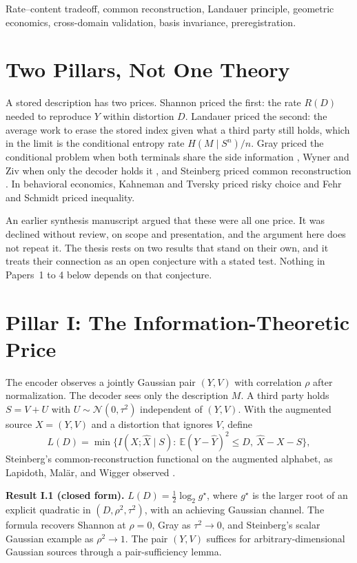 \documentclass[11pt,onecolumn]{IEEEtran}
\newcommand{\E}{\mathbb{E}}
\newcommand{\hY}{\hat Y}
\newcommand{\hX}{\hat X}
\begin{document}
\begin{IEEEkeywords}
Rate--content tradeoff, common reconstruction, Landauer principle, geometric economics, cross-domain validation, basis invariance, preregistration.
\end{IEEEkeywords}

\section{Two Pillars, Not One Theory}

A stored description has two prices.
Shannon priced the first: the rate $R(D)$ needed to reproduce $Y$ within distortion $D$.
Landauer priced the second: the average work to erase the stored index given what a third party still holds, which in the limit is the conditional entropy rate $H(M\mid S^n)/n$.
Gray priced the conditional problem when both terminals share the side information \cite{gray1972tr,gray1973}, Wyner and Ziv when only the decoder holds it \cite{wynerziv1976}, and Steinberg priced common reconstruction \cite{steinberg2009}.
In behavioral economics, Kahneman and Tversky priced risky choice and Fehr and Schmidt priced inequality.

An earlier synthesis manuscript argued that these were all one price.
It was declined without review, on scope and presentation, and the argument here does not repeat it.
The thesis rests on two results that stand on their own, and it treats their connection as an open conjecture with a stated test.
Nothing in Papers~1 to 4 below depends on that conjecture.

\section{Pillar I: The Information-Theoretic Price}

The encoder observes a jointly Gaussian pair $(Y,V)$ with correlation $\rho$ after normalization.
The decoder sees only the description $M$.
A third party holds $S=V+U$ with $U\sim\mathcal N(0,\tau^2)$ independent of $(Y,V)$.
With the augmented source $X=(Y,V)$ and a distortion that ignores $V$, define
\begin{equation}
L(D)=\min\bigl\{I(X;\hX\mid S):\ \E(Y-\hY)^2\le D,\ \hX - X - S\bigr\},
\end{equation}
Steinberg's common-reconstruction functional on the augmented alphabet, as Lapidoth, Mal\"ar, and Wigger observed \cite{lapidoth2014}.

\textbf{Result I.1 (closed form).}
$L(D)=\tfrac12\log_2 g^\star$, where $g^\star$ is the larger root of an explicit quadratic in $(D,\rho^2,\tau^2)$, with an achieving Gaussian channel.
The formula recovers Shannon at $\rho=0$, Gray as $\tau^2\to0$, and Steinberg's scalar Gaussian example as $\rho^2\to1$.
The pair $(Y,V)$ suffices for arbitrary-dimensional Gaussian sources through a pair-sufficiency lemma.
\end{document}
